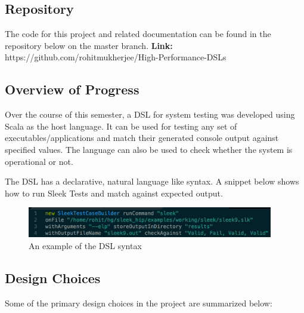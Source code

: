\documentclass[12 pt]{article}
\begin{document}
\subsection{Repository}
The code for this project and related documentation can be found in the repository below on the master branch.\newline
\textbf{Link:} https://github.com/rohitmukherjee/High-Performance-DSLs

\subsection{Overview of Progress}
Over the course of this semester, a DSL for system testing was developed using Scala as the host language. It can be used for testing any set of executables/applications and match their generated console output against specified values. The language can also be used to check whether the system is operational or not.
\bigskip

\noindent
The DSL has a declarative, natural language like syntax. A snippet below shows how to run Sleek Tests and match against expected output.

\begin{figure}[h!]
  \centering
    \includegraphics[height=50px]{figures/code_snippet_1.png}
  \caption{An example of the DSL syntax}
\end{figure}

\subsection{Design Choices}

Some of the primary design choices in the project are summarized below:
\end{document}
